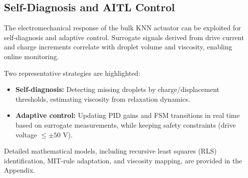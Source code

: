 \subsection{Self-Diagnosis and AITL Control}

The electromechanical response of the bulk KNN actuator can be exploited 
for self-diagnosis and adaptive control. 
Surrogate signals derived from drive current and charge increments 
correlate with droplet volume and viscosity, enabling online monitoring.

Two representative strategies are highlighted:

\begin{itemize}
  \item \textbf{Self-diagnosis:} Detecting missing droplets 
  by charge/displacement thresholds, estimating viscosity 
  from relaxation dynamics.
  \item \textbf{Adaptive control:} Updating PID gains and FSM transitions 
  in real time based on surrogate measurements, while keeping 
  safety constraints (drive voltage $\leq \pm 50$ V).
\end{itemize}

Detailed mathematical models, including recursive least squares (RLS) 
identification, MIT-rule adaptation, and viscosity mapping, 
are provided in the Appendix.
